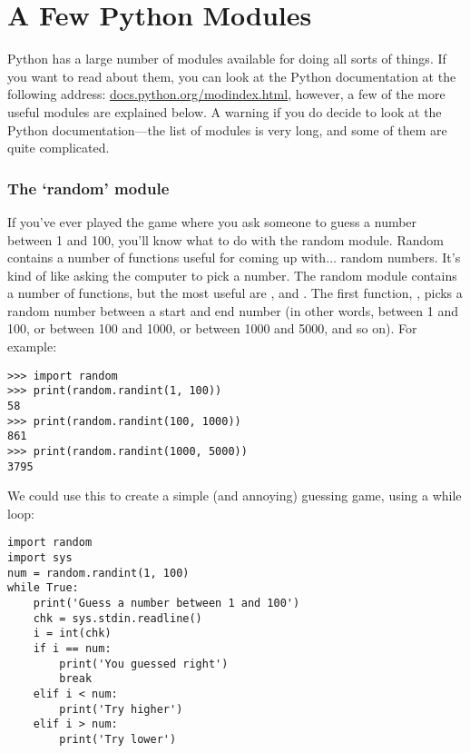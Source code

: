 

\chapter{A Few Python Modules}\label{app:afewpythonmodules}

Python has a large number of modules available for doing all sorts of things.  If you want to read about them, you can look at the Python documentation at the following address: \href{http://docs.python.org/modindex.html}{docs.python.org/modindex.html}, however, a few of the more useful modules are explained below.  A warning if you do decide to look at the Python documentation---the list of modules is very long, and some of them are quite complicated.

\subsection*{The `random' module}

If you've ever played the game where you ask someone to guess a number between 1 and 100, you'll know what to do with the random module.  Random contains a number of functions useful for coming up with$\ldots$ random numbers. It's kind of like asking the computer to pick a number. The random module contains a number of functions, but the most useful are ,  and . The first function, ,  picks a random number between a start and end number (in other words, between 1 and 100, or between 100 and 1000, or between 1000 and 5000, and so on).  For example:

\begin{Verbatim}[frame=single]
>>> import random
>>> print(random.randint(1, 100))
58
>>> print(random.randint(100, 1000))
861
>>> print(random.randint(1000, 5000))
3795
\end{Verbatim}

We could use this to create a simple (and annoying) guessing game, using a while loop:

\begin{Verbatim}[frame=single]
import random
import sys
num = random.randint(1, 100)
while True:
    print('Guess a number between 1 and 100')
    chk = sys.stdin.readline()
    i = int(chk)
    if i == num:
        print('You guessed right')
        break
    elif i < num:
        print('Try higher')
    elif i > num:
        print('Try lower')
\end{Verbatim}

